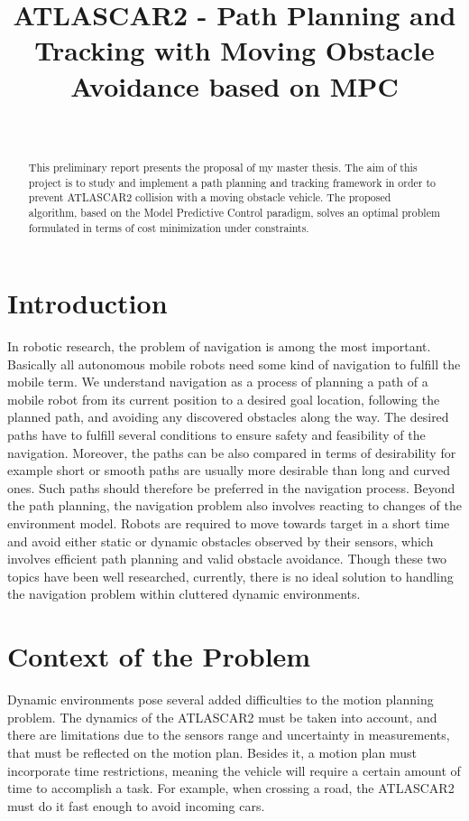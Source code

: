 \documentclass[11pt]{IEEEtran}
\title{ATLASCAR2 - Path Planning and Tracking with Moving Obstacle Avoidance based on MPC}
\author{\IEEEauthorblockN{Alberto Franco}\\
\IEEEauthorblockA{Department of Information Engineering\\
Università degli Studi di Padova\\ \href{mailto:alberto.franco.3@studenti.unipd.it}{alberto.franco.3@studenti.unipd.it}}}
\begin{document}
\maketitle
\begin{abstract}
This preliminary report presents the proposal of my master thesis. The aim of this project is to study and implement a path planning and tracking framework in order to prevent ATLASCAR2 collision with a moving obstacle vehicle. The proposed algorithm, based on the Model Predictive Control paradigm, solves an optimal problem formulated in terms of cost minimization under constraints.
\end{abstract}
\vspace{-1em}
\section{Introduction}
In robotic research, the problem of navigation is among the most important. Basically all autonomous mobile robots need some kind of navigation to fulfill the mobile term.
We understand navigation as a process of planning a path of a mobile robot from its current position to a desired goal location, following the planned path, and avoiding any discovered obstacles along the way. The desired paths have to
fulfill several conditions to ensure safety and feasibility of the navigation. Moreover, the paths can be also compared in terms of desirability for example short or smooth paths are usually more desirable than long and curved ones. Such paths should therefore be preferred in the navigation process. Beyond the path planning, the navigation problem also involves reacting to changes of the environment model. Robots are required to move towards target in a short time and avoid either static or dynamic obstacles observed by their sensors, which involves efficient path planning and valid obstacle avoidance. Though these two topics have been well researched, currently, there is no ideal solution to handling the navigation problem within cluttered dynamic environments.

\section{Context of the Problem}
Dynamic environments pose several added difficulties to the motion planning problem. The dynamics of the ATLASCAR2 must be taken into account, and there are limitations due to the sensors range and uncertainty in measurements, that must be reflected on the motion plan. Besides it, a motion plan must incorporate time restrictions, meaning the vehicle will require a certain amount of time to accomplish a task. For example, when crossing a road, the ATLASCAR2 must do it fast enough to avoid incoming cars. 
   
\end{document}
